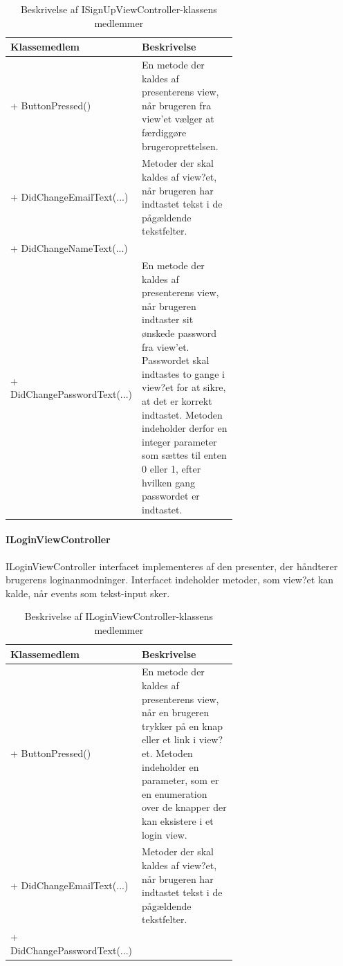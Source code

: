 \begin{table}
	\centering
	\begin{tabular}{| l | p{0.65\linewidth} |}
		\toprule
		\textbf{Klassemedlem}	& \textbf{Beskrivelse} \\
		\midrule
		+ ButtonPressed()				& En metode der kaldes af presenterens view, når brugeren fra view'et vælger at færdiggøre brugeroprettelsen.	\\\hline
		+ DidChangeEmailText(...) 			& Metoder der skal kaldes af view?et, når brugeren har indtastet tekst i de pågældende tekstfelter. \\
		+ DidChangeNameText(...)  			& \\\hline
		+ DidChangePasswordText(...) 				& En metode der kaldes af presenterens view, når brugeren indtaster sit ønskede password fra view'et. Passwordet skal indtastes to gange i view?et for at sikre, at det er korrekt indtastet. Metoden indeholder derfor en integer parameter som sættes til enten 0 eller 1, efter hvilken gang passwordet er indtastet. \\
		\bottomrule
		\end{tabular}
	\caption{Beskrivelse af ISignUpViewController-klassens medlemmer}
	\label{tab:table_design_isignupviewcontroller}	
\end{table}

\paragraph{ILoginViewController}
ILoginViewController interfacet implementeres af den presenter, der håndterer brugerens loginanmodninger. Interfacet indeholder metoder, som view?et kan kalde, når events som tekst-input sker.

\begin{table}
	\centering
	\begin{tabular}{| l | p{0.65\linewidth} |}
		\toprule
		\textbf{Klassemedlem}	& \textbf{Beskrivelse} \\
		\midrule
		+ ButtonPressed()				& En metode der kaldes af presenterens view, når en brugeren trykker på en knap eller et link i view?et. Metoden indeholder en parameter, som er en enumeration over de knapper der kan eksistere i et login view.	\\\hline
		+ DidChangeEmailText(...) 			& Metoder der skal kaldes af view?et, når brugeren har indtastet tekst i de pågældende tekstfelter. \\
		+ DidChangePasswordText(...) 				& \\
		\bottomrule
		\end{tabular}
	\caption{Beskrivelse af ILoginViewController-klassens medlemmer}
	\label{tab:table_design_iloginviewcontroller}	
\end{table}

